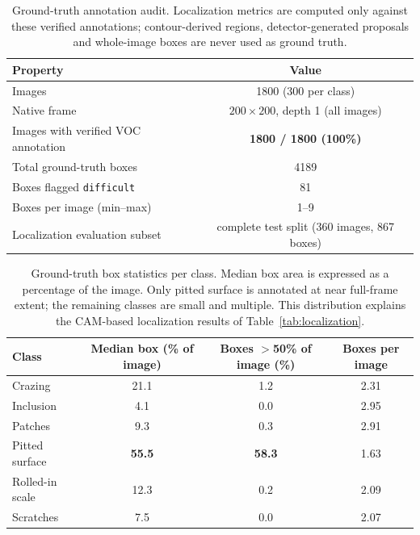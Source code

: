 \begin{table}[t]
\centering
\caption{Ground-truth annotation audit. Localization metrics are computed only against these verified annotations; contour-derived regions, detector-generated proposals and whole-image boxes are never used as ground truth.}
\label{tab:gt_protocol}
\renewcommand{\arraystretch}{1.15}
\begin{tabular}{lc}
\toprule
\textbf{Property} & \textbf{Value} \\
\midrule
Images & 1800 (300 per class) \\
Native frame & $200\times200$, depth 1 (all images) \\
Images with verified VOC annotation & \textbf{1800 / 1800 (100\%)} \\
Total ground-truth boxes & 4189 \\
Boxes flagged \texttt{difficult} & 81 \\
Boxes per image (min--max) & 1--9 \\
Localization evaluation subset & complete test split (360 images, 867 boxes) \\
\bottomrule
\end{tabular}
\end{table}


\begin{table}[t]
\centering
\caption{Ground-truth box statistics per class. Median box area is expressed as a percentage of the image. Only pitted surface is annotated at near full-frame extent; the remaining classes are small and multiple. This distribution explains the CAM-based localization results of Table~\ref{tab:localization}.}
\label{tab:boxsize}
\renewcommand{\arraystretch}{1.15}
\begin{tabular}{lccc}
\toprule
\textbf{Class} & \textbf{Median box (\% of image)} & \textbf{Boxes $>$50\% of image (\%)} & \textbf{Boxes per image} \\
\midrule
Crazing & 21.1 & 1.2 & 2.31 \\
Inclusion & 4.1 & 0.0 & 2.95 \\
Patches & 9.3 & 0.3 & 2.91 \\
Pitted surface & \textbf{55.5} & \textbf{58.3} & 1.63 \\
Rolled-in scale & 12.3 & 0.2 & 2.09 \\
Scratches & 7.5 & 0.0 & 2.07 \\
\bottomrule
\end{tabular}
\end{table}


